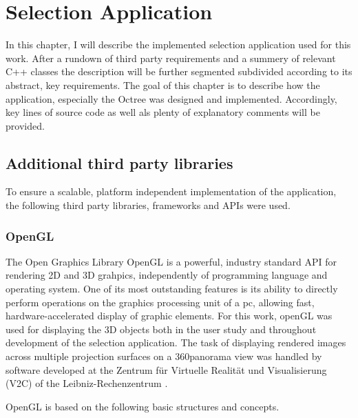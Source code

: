 \chapter{Selection Application}
\label{sec:selection_application}

In this chapter, I will describe the implemented selection application used for this work. After a rundown of third party requirements and a summery of relevant C++ classes the description will be further segmented subdivided according to its abstract, key requirements.
The goal of this chapter is to describe how the application, especially the Octree\cite{Octree} was designed and implemented. Accordingly, key lines of source code as well als plenty of explanatory comments will be provided.

\section{Additional third party libraries}
\label{sec:additional_third_party_libraries}


To ensure a scalable, platform independent implementation of the application, the following third party libraries, frameworks and APIs were used.

\subsection{OpenGL}
\label{sec:opengl}

The Open Graphics Library OpenGL \cite{OpenGL} is a powerful, industry standard API for rendering 2D and 3D grahpics, independently of programming language and operating system. One of its most outstanding features is its ability to directly perform operations on the graphics processing unit of a pc, allowing fast, hardware-accelerated display of graphic elements. For this work, openGL was used for displaying the 3D objects both in the user study and throughout development of the selection application. The task of displaying rendered images across multiple projection surfaces on a 360\degree panorama view was handled by software developed at the Zentrum f\"ur Virtuelle Realit\"at und Visualisierung (V2C) of the Leibniz-Rechenzentrum \cite{v2c}.

OpenGL is based on the following basic structures and concepts.

